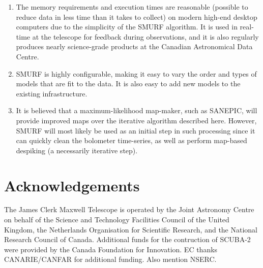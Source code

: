 \documentclass[useAMS,usenatbib,nofootinbib]{mn2e}
\newcommand{\scuba}{SCUBA-2}
\begin{document}
\begin{enumerate}
\item The memory requirements and execution times are reasonable
(possible to reduce data in less time than it takes to collect) on
modern high-end desktop computers due to the simplicity of the SMURF
algorithm. It is used in real-time at the telescope for feedback
during observations, and it is also regularly produces nearly
science-grade products at the Canadian Astronomical Data Centre.

\item SMURF is highly configurable, making it easy to vary the order
and types of models that are fit to the data. It is also easy to add
new models to the existing infrastructure.

\item It is believed that a maximum-likelihood map-maker, such as
SANEPIC, will provide improved maps over the iterative algorithm
described here. However, SMURF will most likely be used as an initial
step in such processing since it can quickly clean the bolometer
time-series, as well as perform map-based despiking (a necessarily
iterative step).

\end{enumerate}




\section{Acknowledgements}

The James Clerk Maxwell Telescope is operated by the Joint Astronomy
Centre on behalf of the Science and Technology Facilities Council of
the United Kingdom, the Netherlands Organisation for Scientific
Research, and the National Research Council of Canada. Additional
funds for the contruction of SCUBA-2 were provided by the Canada
Foundation for Innovation. EC thanks CANARIE/CANFAR for additional
funding. Also mention NSERC.
\end{document}
